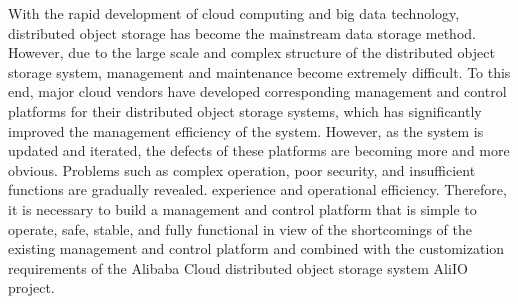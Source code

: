 \begin{abstract*}



  With the rapid development of cloud computing and big data technology, distributed object storage has become the mainstream data storage method. 
  However, due to the large scale and complex structure of the distributed object storage system, management and maintenance become extremely difficult. 
  To this end, major cloud vendors have developed corresponding management and control platforms for their distributed object storage systems, which has 
  significantly improved the management efficiency of the system. However, as the system is updated and iterated, the defects of these platforms are becoming 
  more and more obvious. Problems such as complex operation, poor security, and insufficient functions are gradually revealed. experience and operational efficiency. 
  Therefore, it is necessary to build a management and control platform that is simple to operate, safe, stable, and fully functional in view of the shortcomings of 
  the existing management and control platform and combined with the customization requirements of the Alibaba Cloud distributed object storage system AliIO project.
  

\end{abstract*}
